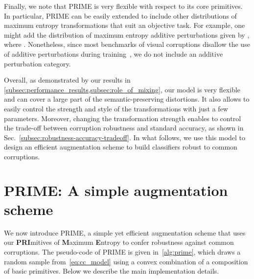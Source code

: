 \documentclass[runningheads]{llncs}
\begin{document}
\AlgoDontDisplayBlockMarkers
{}
\SetAlgoNoLine
\LinesNumbered
{}

Finally, we note that PRIME is very flexible with respect to its core primitives. In particular, PRIME can be easily extended to include other distributions of maximum entropy transformations that suit an objective task. For example, one might add the distribution of maximum entropy additive perturbations given by , where . Nonetheless, since most benchmarks of visual corruptions disallow the use of additive perturbations during training~\cite{corruptions2019}, we do not include an additive perturbation category.





Overall, as demonstrated by our results in \cref{subsec:performance_results,subsec:role_of_mixing}, our model is very flexible and can cover a large part of the semantic-preserving distortions. It also allows to easily control the strength and style of the transformations with just a few parameters. Moreover, changing the transformation strength enables to control the trade-off between corruption robustness and standard accuracy, as shown in Sec.~\ref{subsec:robustness-accuracy-tradeoff}. In what follows, we use this model to design an efficient augmentation scheme to build classifiers robust to common corruptions.



\section{PRIME: A simple augmentation scheme}
\label{sec:prime}


We now introduce PRIME, a simple yet efficient augmentation scheme that uses our \textbf{PRI}mitives of \textbf{M}aximum \textbf{E}ntropy to confer robustness against common corruptions. The pseudo-code of PRIME is given in~\cref{alg:prime}, which draws a random sample from~\cref{eq:cc_model} using a convex combination of a composition of basic primitives. Below we describe the main implementation details.
\end{document}
